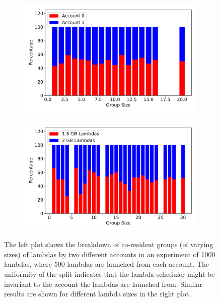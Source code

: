 \begin{figure}[!t]
    \begin{subfigure}{.5\textwidth}
      \centering
      \includegraphics[width=.99\linewidth]{fig/different-accounts.pdf}
    \end{subfigure}%
    \begin{subfigure}{.5\textwidth}
      \centering
      \includegraphics[width=.99\linewidth]{fig/different-sizes.pdf}
    \end{subfigure}

    \caption{The left plot shows the breakdown of co-resident groups (of varying
    sizes) of lambdas by two different accounts in an experiment of 1000
    lambdas, where 500 lambdas are launched from each account. The uniformity of
    the split indicates that the lambda scheduler might be invariant to the
    account the lambdas are launched from. Similar results are shown for
    different lambda sizes in the right plot. }
    \label{fig:factors}
\end{figure}


